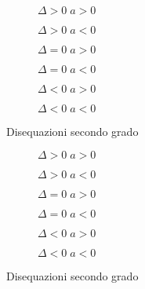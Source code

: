 \begin{figure}[ht]
	\centering
	\begin{subfigure}[b]{0.4\textwidth}\captionsetup{skip=10pt}\caption{$\Delta>0\; a>0$ }
	\centering
	\end{subfigure}\qquad
	\begin{subfigure}[b]{0.4\textwidth}\captionsetup{skip=10pt}	\caption{$\Delta>0\; a<0$ }
	\centering
		\end{subfigure}\qquad\qquad
	\begin{subfigure}[b]{0.4\textwidth}\captionsetup{skip=10pt}\caption{$\Delta=0\; a>0$ }
	\centering
\end{subfigure}\qquad
\begin{subfigure}[b]{0.4\textwidth}\captionsetup{skip=10pt}\caption{$\Delta=0\; a<0$ }
	\centering
\end{subfigure}\qquad\qquad
	\begin{subfigure}[b]{0.4\textwidth}\captionsetup{skip=10pt}	\caption{$\Delta<0\; a>0$ }
	\centering
\end{subfigure}\qquad
\begin{subfigure}[b]{0.4\textwidth}	\captionsetup{skip=10pt}\caption{$\Delta<0\; a<0$ }
	\centering
\end{subfigure}
	\caption{Disequazioni secondo grado}
\end{figure}

\begin{figure}[ht]
	\centering
	\begin{subfigure}[b]{0.4\textwidth}\captionsetup{skip=10pt}\caption{$\Delta>0\; a>0$ }
		\centering
	\end{subfigure}\qquad
	\begin{subfigure}[b]{0.4\textwidth}\captionsetup{skip=10pt}	\caption{$\Delta>0\; a<0$ }
		\centering
	\end{subfigure}\qquad\qquad
	\begin{subfigure}[b]{0.4\textwidth}\captionsetup{skip=10pt}\caption{$\Delta=0\; a>0$ }
		\centering
	\end{subfigure}\qquad
	\begin{subfigure}[b]{0.4\textwidth}\captionsetup{skip=10pt}\caption{$\Delta=0\; a<0$ }
		\centering
	\end{subfigure}\qquad\qquad
	\begin{subfigure}[b]{0.4\textwidth}\captionsetup{skip=10pt}	\caption{$\Delta<0\; a>0$ }
		\centering
	\end{subfigure}\qquad
	\begin{subfigure}[b]{0.4\textwidth}	\captionsetup{skip=10pt}\caption{$\Delta<0\; a<0$ }
		\centering
	\end{subfigure}
	\caption{Disequazioni secondo grado}
\end{figure}


